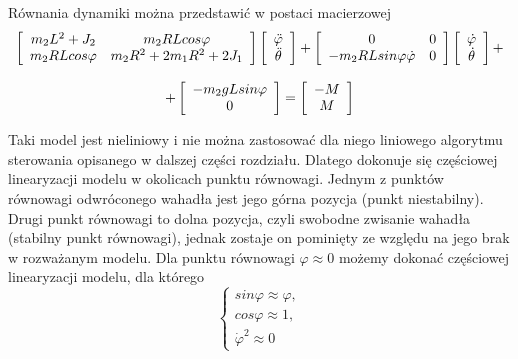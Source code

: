 Równania dynamiki można przedstawić w postaci macierzowej
$$
    \begin{array}{cc}
        \left[ \begin{array}{cc}
        m_2L^2 + J_2 & m_2RLcos\varphi \\
        m_2RLcos\varphi & m_2R^2 + 2m_1R^2 + 2J_1
        \end{array} \right]
        \left[ \begin{array}{c}
        \Ddot{\varphi} \\
        \Ddot{\theta}
        \end{array} \right]
        +
        \left[ \begin{array}{cc}
        0 & 0 \\
        -m_2RLsin\varphi\dot{\varphi} & 0
        \end{array} \right]
        \left[ \begin{array}{c}
        \dot{\varphi} \\
        \dot{\theta}
        \end{array} \right]
        + \\ \\ +
        \left[ \begin{array}{c}
        -m_2gLsin\varphi \\
        0
        \end{array} \right]
        = 
        \left[ \begin{array}{c}
        -M \\
        M
        \end{array} \right]
    \end{array}
$$

Taki model jest nieliniowy i nie można zastosować dla niego liniowego algorytmu sterowania opisanego w dalszej części rozdziału. Dlatego dokonuje się częściowej linearyzacji modelu w okolicach punktu równowagi. Jednym z punktów równowagi odwróconego wahadła jest jego górna pozycja (punkt niestabilny). Drugi punkt równowagi to dolna pozycja, czyli swobodne zwisanie wahadła (stabilny punkt równowagi), jednak zostaje on pominięty ze względu na jego brak w rozważanym modelu. Dla punktu równowagi $\varphi \approx 0$ możemy dokonać częściowej linearyzacji modelu, dla którego
$$
    \left\{
    \begin{array}{c}
    sin\varphi \approx \varphi, \\
    cos\varphi \approx 1, \\
    \dot{\varphi}^2 \approx 0
    \end{array}
    \right.
$$

